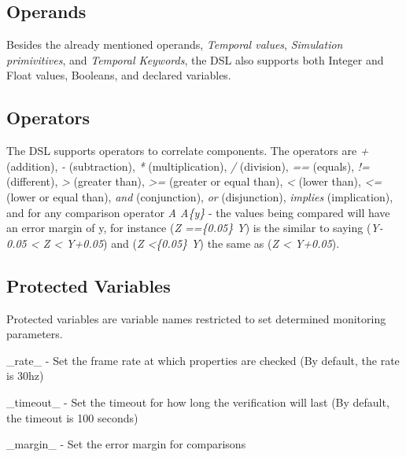 \subsection{Operands}
\label{ssec:operands}

Besides the already mentioned operands, \textit{Temporal values}, \textit{Simulation primivitives}, and \textit{Temporal Keywords}, the DSL also supports both Integer and Float values, Booleans, and declared variables.


\subsection{Operators}
\label{ssec:operators}

The DSL supports operators to correlate components. The operators are \textit{+} (addition), \textit{-} (subtraction), \textit{*} (multiplication), \textit{/} (division), \textit{==} (equals), \textit{!=} (different), \textit{>} (greater than), \textit{>=} (greater or equal than), \textit{<} (lower than), \textit{<=} (lower or equal than), \textit{and} (conjunction), \textit{or} (disjunction), \textit{implies} (implication), and for any comparison operator \textit{A A\{y\}} - the values being compared will have an error margin of y, for instance (\textit{Z ==\{0.05\} Y}) is the similar to saying (\textit{Y-0.05 < Z < Y+0.05}) and (\textit{Z <\{0.05\} Y}) the same as (\textit{Z < Y+0.05}).


\subsection{Protected Variables}
\label{ssec:protectedvariables}

Protected variables are variable names restricted to set determined monitoring parameters.

\_rate\_ - Set the frame rate at which properties are checked (By default, the rate is 30hz)

\_timeout\_ - Set the timeout for how long the verification will last (By default, the timeout is 100 seconds)

\_margin\_ - Set the error margin for comparisons


